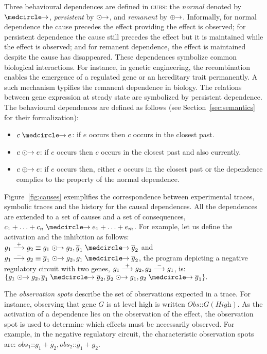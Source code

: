 \documentclass{eptcs}
\newcommand{\ie}[0]{\abbrev{\textit{i.e.}}}
\newcommand{\activate}[0]{\stackrel{+}{\reg}}
\newcommand{\inhibit}[0]{\stackrel{-}{\reg}}
\newcounter{ti}
\begin{document}
Three behavioural dependences are defined in \textsc{gubs}: the \emph{normal} denoted by $\cause$, \emph{persistent} by $\mathrel{\odot\kern-3.25pt \to}$, and \emph{remanent} by $\mathrel{\oplus\kern-3.25pt \to}$. Informally, for normal dependence the cause precedes the effect providing the effect is observed; for persistent dependence the cause still precedes the effect but it is maintained while the effect is observed; and for remanent dependence, the effect is maintained despite the cause has disappeared. These dependences symbolize common biological interactions. For instance,
in genetic engineering, the recombination enables the emergence of a regulated gene or an hereditary trait permanently. A such mechanism typifies the remanent dependence in biology. The relations between gene expression at steady state are symbolized by persistent dependence. The behavioural dependences are defined as follows (see Section~\ref{sec:semantics} for their formalization): 
\begin{itemize}
\item $c \cause e$: if $e$ occurs then $c$ occurs in the closest past.
\item $c \mathrel{\odot\kern-3.25pt \to} e$: if $e$ occurs then $c$ occurs in the closest past and also currently.
\item $c \mathrel{\oplus\kern-3.25pt \to} e$: if $e$ occurs then, either $e$ occurs in the closest past or the dependence complies to the property of the normal dependence.
\end{itemize}
Figure~\ref{fig:causes} exemplifies the correspondence between experimental traces, symbolic traces and the history for the causal dependences. 
 All the dependences are extended to a set of causes and a set of consequences, \ie $c_1 + \ldots + c_n \cause e_1+ \ldots + e_m$. 
For example, let us define the activation and the inhibition as follows:
$ g_1 \activate g_2 \equiv g_1 \pcause g_2, \overline g_1 \cause \overline g_2$ and $g_1 \inhibit g_2 \equiv\overline g_1 \pcause g_2, g_1 \cause \overline g_2 $, 
the program depicting a negative regulatory circuit with two genes, \ie $g_1 \activate g_2, g_2 \inhibit g_1$, is:
$ \{ g_1 \pcause g_2, \overline g_1 \cause \overline g_2,\overline g_2 \pcause g_1, g_2 \cause \overline g_1 \}.$

The \emph{observation spots} describe the set of observations expected in a trace. For instance, observing that gene $G$ is at level high is written $\textit{Obs}\textbf{::}G(\textit{High})$. As the activation of a dependence lies on the observation of the effect, the observation spot is used to determine which effects must be necessarily observed. For example, in the negative regulatory circuit, the characteristic observation spots are: $\textit{obs}_1\textbf{::} g_1 + \overline g_2, \textit{obs}_2\textbf{::}\overline g_1+ g_2$.
\end{document}
